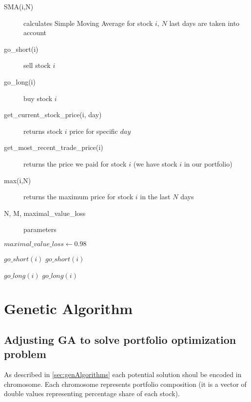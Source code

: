 \begin{description}

\item[SMA(i,N)]
  calculates Simple Moving Average for stock $i$, $N$ last days are taken into account  
\item[go\_short(i)]
  sell stock $i$
\item[go\_long(i)]
  buy stock $i$
\item[get\_current\_stock\_price(i, day)]
  returns stock $i$ price for specific $day$ 
\item[get\_most\_recent\_trade\_price(i)]
  returns the price we paid for stock $i$ (we have stock $i$ in our portfolio)
\item[max(i,N)]
  returns the maximum price for stock $i$ in the last $N$ days
\item[N, M, maximal\_value\_loss]
  parameters 
\end{description}
% 


\begin{algorithmic}

\STATE $maximal\_value\_loss \gets 0.98$



	    \STATE $go\_short(i)$
    \ELSE
		    \STATE $go\_short(i)$
	    \ENDIF
    \ENDIF

	    \STATE $go\_long(i)$
    \ELSE
		    \STATE $go\_long(i)$
	    \ENDIF
    \ENDIF

  \ENDFOR

\ENDFOR

\end{algorithmic}


\section{Genetic Algorithm}
\label{sec:genAlgoImpl}

\subsection{Adjusting GA to solve portfolio optimization problem}

As described in \ref{sec:genAlgorithms} each potential solution shoul be encoded in chromosome. 
Each chromosome represents portfolio composition (it is a vector of double values representing percentage share of each stock).

